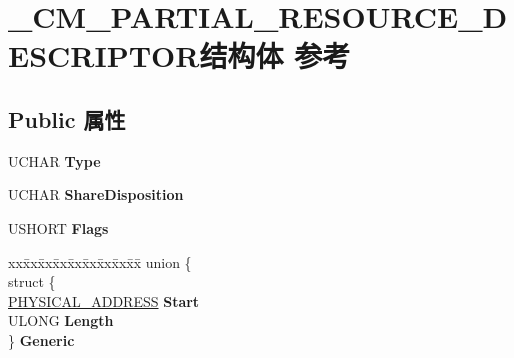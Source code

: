 \hypertarget{struct___c_m___p_a_r_t_i_a_l___r_e_s_o_u_r_c_e___d_e_s_c_r_i_p_t_o_r}{}\section{\+\_\+\+C\+M\+\_\+\+P\+A\+R\+T\+I\+A\+L\+\_\+\+R\+E\+S\+O\+U\+R\+C\+E\+\_\+\+D\+E\+S\+C\+R\+I\+P\+T\+O\+R结构体 参考}
\label{struct___c_m___p_a_r_t_i_a_l___r_e_s_o_u_r_c_e___d_e_s_c_r_i_p_t_o_r}
\subsection*{Public 属性}
\begin{DoxyCompactItemize}
\item 
\mbox{\label{struct___c_m___p_a_r_t_i_a_l___r_e_s_o_u_r_c_e___d_e_s_c_r_i_p_t_o_r_aa28bee4b504a2b1d4d8ec03d78aa2429}} 
U\+C\+H\+AR {\bfseries Type}
\item 
\mbox{\label{struct___c_m___p_a_r_t_i_a_l___r_e_s_o_u_r_c_e___d_e_s_c_r_i_p_t_o_r_a02eec1ea2abab1de944ebc5c28fa42f9}} 
U\+C\+H\+AR {\bfseries Share\+Disposition}
\item 
\mbox{\label{struct___c_m___p_a_r_t_i_a_l___r_e_s_o_u_r_c_e___d_e_s_c_r_i_p_t_o_r_ab1b911e76afbc6b4975330e65f2e5e45}} 
U\+S\+H\+O\+RT {\bfseries Flags}
\item 
\mbox{\label{struct___c_m___p_a_r_t_i_a_l___r_e_s_o_u_r_c_e___d_e_s_c_r_i_p_t_o_r_a8cb445f4d0c0814d5524587fdc7f7eb9}} 
\begin{tabbing}
xx\=xx\=xx\=xx\=xx\=xx\=xx\=xx\=xx\=\kill
union \{\\
\>struct \{\\
\>\>\hyperlink{union___l_a_r_g_e___i_n_t_e_g_e_r}{PHYSICAL\_ADDRESS} {\bfseries Start}\\
\>\>ULONG {\bfseries Length}\\
\>\} {\bfseries Generic}\\

\end{tabbing}
\end{DoxyCompactItemize}
